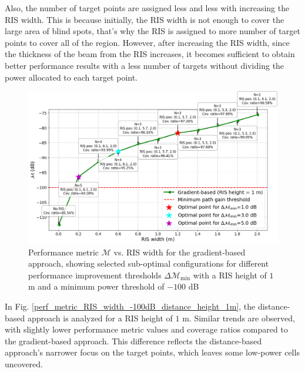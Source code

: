 \documentclass{IEEEoj}
\begin{document}
Also, the number of target points are assigned less and less with increasing the RIS width. This is because initially, the RIS width is not enough to cover the large area of blind spots, that's why the RIS is assigned to more number of target points to cover all of the region. However, after increasing the RIS width, since the thickness of the beam from the RIS increases, it becomes sufficient to obtain better performance results with a less number of targets without dividing the power allocated to each target point.

\begin{figure}
	\centering
	\includegraphics[width=\linewidth]{Sim_Results/perf_metric_RIS_width_-100dB_gradient_height_1m.png}
	\caption{Performance metric $\mathcal{M}$ vs. RIS width for the gradient-based approach, showing selected sub-optimal configurations for different performance improvement thresholds $\Delta \mathcal{M}_{\text{min}}$ with a RIS height of $1$ m and a minimum power threshold of $-100$ dB}
	\label{perf_metric_RIS_width_-100dB_gradient_height_1m}
\end{figure}

In Fig. \ref{perf_metric_RIS_width_-100dB_distance_height_1m}, the distance-based approach is analyzed for a RIS height of $1$ m. Similar trends are observed, with slightly lower performance metric values and coverage ratios compared to the gradient-based approach. This difference reflects the distance-based approach’s narrower focus on the target points, which leaves some low-power cells uncovered.
\end{document}
